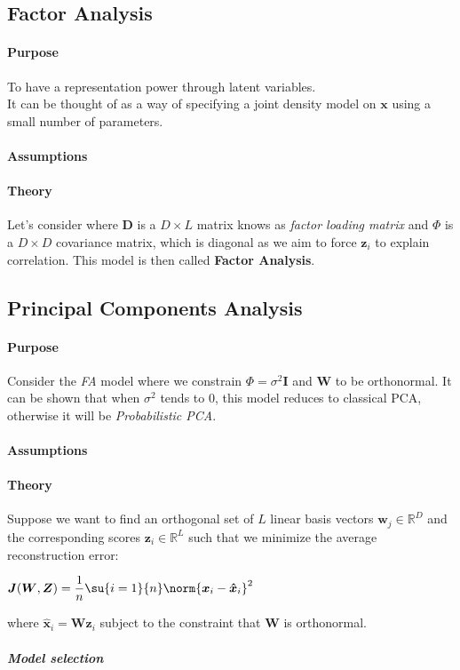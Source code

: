 \subsection{Factor Analysis}
\paragraph{Purpose}
To have a representation power through latent variables.\\
It can be thought of as a way of specifying a joint density model on $\bm{x}$ using
a small number of parameters.
\paragraph{Assumptions}
\paragraph{Theory}
Let's consider 
where $\bm{D}$ is a $D\times L$ matrix knows as \emph{factor loading matrix} and $\Phi$
is a $D\times D$ covariance matrix, which is diagonal as we aim to force $\bm{z}_{i}$
to explain correlation.
This model is then called \textbf{Factor Analysis}.

\subsection{Principal Components Analysis}
\paragraph{Purpose}
Consider the \emph{FA} model where we constrain $\Phi = \sigma^{2}\bm{I}$ and $\bm{W}$
to be orthonormal. It can be shown that when $\sigma^{2}$ tends to 0, this model 
reduces to classical PCA, otherwise it will be \emph{Probabilistic PCA}.
\paragraph{Assumptions}
\paragraph{Theory}
Suppose we want to find an orthogonal set of $L$ linear basis vectors $\bm{w}_{j}\in
\mathbb{R}^{D}$ and the corresponding scores $\bm{z}_{i}\in\mathbb{R}^{L}$ such that we
minimize the average reconstruction error:
\begin{center}
    $\bm{J}(\bm{W}, \bm{Z}) = \dfrac{1}{n}\su{i=1}{n}\norm{\bm{x}_{i} - 
    \bm{\hat{x}}_{i}}^{2}$
\end{center}
where $\bm{\hat{x}}_{i} = \bm{W}\bm{z}_{i}$ subject to the constraint that $\bm{W}$
is orthonormal. 
\subparagraph{Model selection}

